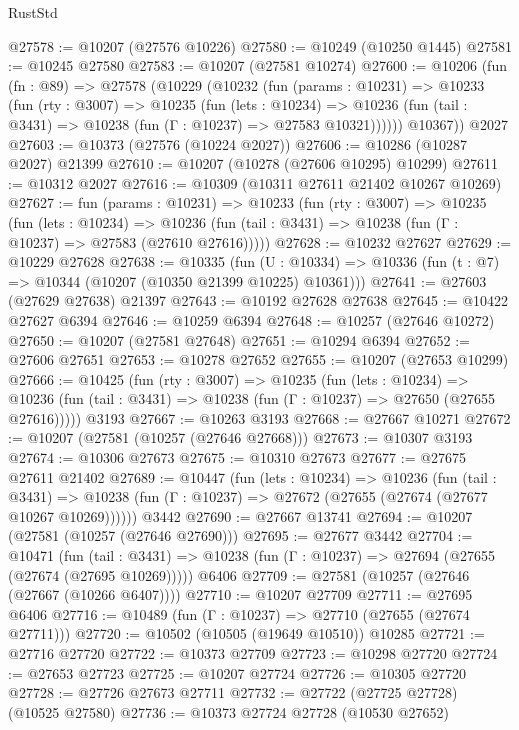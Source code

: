 \begin{lexlean}{RustStd}
\begin{coremodule}
@27578 := @10207 (@27576 @10226)
@27580 := @10249 (@10250 @1445)
@27581 := @10245 @27580
@27583 := @10207 (@27581 @10274)
@27600 := @10206
    (fun (fn : @89) =>
    @27578
      (@10229
        (@10232
          (fun (params : @10231) =>
          @10233
            (fun (rty : @3007) =>
            @10235
              (fun (lets : @10234) =>
              @10236 (fun (tail : @3431) => @10238 (fun (Γ : @10237) => @27583 @10321))))))
        @10367))
    @2027
@27603 := @10373 (@27576 (@10224 @2027))
@27606 := @10286 (@10287 @2027) @21399
@27610 := @10207 (@10278 (@27606 @10295) @10299)
@27611 := @10312 @2027
@27616 := @10309 (@10311 @27611 @21402 @10267 @10269)
@27627 := fun (params : @10231) =>
  @10233
    (fun (rty : @3007) =>
    @10235
      (fun (lets : @10234) =>
      @10236 (fun (tail : @3431) => @10238 (fun (Γ : @10237) => @27583 (@27610 @27616)))))
@27628 := @10232 @27627
@27629 := @10229 @27628
@27638 := @10335
    (fun (U : @10334) => @10336 (fun (t : @7) => @10344 (@10207 (@10350 @21399 @10225) @10361)))
@27641 := @27603 (@27629 @27638) @21397
@27643 := @10192 @27628 @27638
@27645 := @10422 @27627 @6394
@27646 := @10259 @6394
@27648 := @10257 (@27646 @10272)
@27650 := @10207 (@27581 @27648)
@27651 := @10294 @6394
@27652 := @27606 @27651
@27653 := @10278 @27652
@27655 := @10207 (@27653 @10299)
@27666 := @10425
    (fun (rty : @3007) =>
    @10235
      (fun (lets : @10234) =>
      @10236 (fun (tail : @3431) => @10238 (fun (Γ : @10237) => @27650 (@27655 @27616)))))
    @3193
@27667 := @10263 @3193
@27668 := @27667 @10271
@27672 := @10207 (@27581 (@10257 (@27646 @27668)))
@27673 := @10307 @3193
@27674 := @10306 @27673
@27675 := @10310 @27673
@27677 := @27675 @27611 @21402
@27689 := @10447
    (fun (lets : @10234) =>
    @10236
      (fun (tail : @3431) =>
      @10238 (fun (Γ : @10237) => @27672 (@27655 (@27674 (@27677 @10267 @10269))))))
    @3442
@27690 := @27667 @13741
@27694 := @10207 (@27581 (@10257 (@27646 @27690)))
@27695 := @27677 @3442
@27704 := @10471
    (fun (tail : @3431) => @10238 (fun (Γ : @10237) => @27694 (@27655 (@27674 (@27695 @10269)))))
    @6406
@27709 := @27581 (@10257 (@27646 (@27667 (@10266 @6407))))
@27710 := @10207 @27709
@27711 := @27695 @6406
@27716 := @10489 (fun (Γ : @10237) => @27710 (@27655 (@27674 @27711)))
@27720 := @10502 (@10505 (@19649 @10510)) @10285
@27721 := @27716 @27720
@27722 := @10373 @27709
@27723 := @10298 @27720
@27724 := @27653 @27723
@27725 := @10207 @27724
@27726 := @10305 @27720
@27728 := @27726 @27673 @27711
@27732 := @27722 (@27725 @27728) (@10525 @27580)
@27736 := @10373 @27724 @27728 (@10530 @27652)

\end{coremodule}
\end{lexlean}
